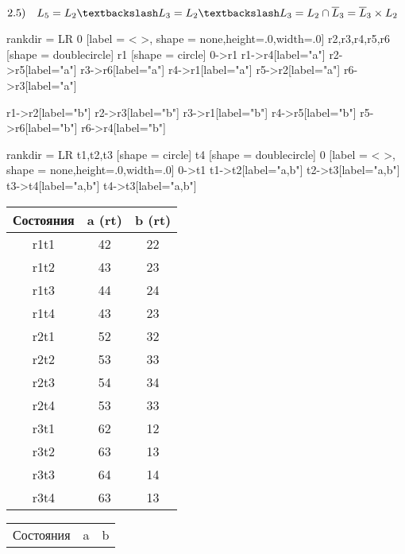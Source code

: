 \documentclass{article}
\begin{document}
\begin{center}
$2.5) \quad L_5 = L_2 \textbackslash L_3 = L_2 \textbackslash L_3 = L_2 \cap \overline L_3 = \overline L_3 \times L_2$ 
\newline

 {
    rankdir = LR
    0 [label = < >, shape = none,height=.0,width=.0]
    r2,r3,r4,r5,r6 [shape = doublecircle]
    r1 [shape = circle]
    0->r1
    r1->r4[label="a"]
    r2->r5[label="a"]
    r3->r6[label="a"]
    r4->r1[label="a"]
    r5->r2[label="a"]
    r6->r3[label="a"]
    
    r1->r2[label="b"]
    r2->r3[label="b"]
    r3->r1[label="b"]
    r4->r5[label="b"]
    r5->r6[label="b"]
    r6->r4[label="b"]
}
 {
    rankdir = LR
    t1,t2,t3 [shape = circle]
    t4 [shape = doublecircle]
    0 [label = < >, shape = none,height=.0,width=.0]
    0->t1
    t1->t2[label="a,b"]
    t2->t3[label="a,b"]
    t3->t4[label="a,b"]
    t4->t3[label="a,b"]
}
\begin{tabular}{ |c|c|c| } 
                \hline
                 Состояния & a (rt) & b (rt) \\
                \hline\hline
                r1t1 & 42 & 22 \\
                \hline 
                r1t2 & 43 & 23 \\
                \hline
                r1t3 & 44 & 24 \\
                \hline
                r1t4 & 43 & 23 \\
                \hline\hline
                r2t1 & 52 & 32 \\
                \hline
                r2t2 & 53 & 33 \\
                \hline
                r2t3 & 54 & 34 \\
                \hline
                r2t4 & 53 & 33 \\
                \hline\hline
                r3t1 & 62 & 12 \\
                \hline
                r3t2 & 63 & 13 \\
                \hline
                r3t3 & 64 & 14 \\
                \hline
                r3t4 & 63 & 13 \\
                \hline
            \end{tabular} \:\:
            \begin{tabular}{ |c|c|c| } 
                \hline
                Состояния & a & b \\

\end{tabular}
\end{center}
\end{document}
